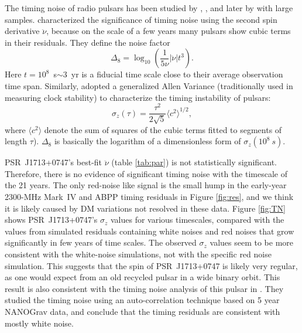 The timing noise of radio pulsars has been studied by \citet{antt94},
\citet{dmhd95}, \citet{mtem97} and later by \citet{hlk10} with large samples. 
\citet{antt94} characterized the significance of timing noise using the second
spin derivative $\ddot{\nu}$, because on the scale of a few years many
pulsars show cubic terms in their residuals. They define the noise factor 
\begin{equation}
\label{eq:delta8}
\Delta_8 = \log_{10}\left(\frac{1}{5\nu}|\ddot{\nu}|t^3\right).
\end{equation}
Here $t=10^8$~s$\sim 3$~yr is a fiducial time scale close to their average
observation time span.
Similarly, \citet{mtem97} adopted a generalized Allen Variance (traditionally used in
measuring clock stability) to characterize the timing instability of pulsars:
\begin{equation}
\label{eq:sigmaz}
\sigma_z(\tau) = \frac{\tau^2}{2\sqrt{5}}\langle c^2 \rangle^{1/2},
\end{equation}
where $\langle c^2\rangle$ denote the sum of squares of the cubic
terms fitted to segments of length $\tau$). 
$\Delta_8$ is basically the logarithm of a dimensionless form of $\sigma_z(10^8~s)$.

PSR~J1713+0747's
best-fit $\ddot{\nu}$ (table \ref{tab:par}) is not statistically significant. 
Therefore, there is no evidence of significant timing noise with the
timescale of the 21 years. The only red-noise like
signal is the small hump in the early-year 2300-MHz Mark~IV and ABPP timing
residuals in Figure \ref{fig:res}, and we think it is likely caused by DM variations not resolved in
these data. Figure \ref{fig:TN} 
shows PSR~J1713+0747's $\sigma_z$ values for various timescales, compared 
with the values from simulated residuals containing white noises and
red noises that grow significantly in few years of time
scales. The observed $\sigma_z$ values seem to be more consistent 
with the white-noise simulations, not with the specific red noise
simulation. This suggests that the spin of PSR~J1713+0747 is likely very
regular, as one would expect from an old recycled pulsar in a wide binary
orbit. %
This result is also consistent with the timing noise analysis of this pulsar in 
\citet{pjl+13}. They
studied the timing noise using an auto-correlation technique
based on 5 year NANOGrav data, and conclude that the timing residuals are
consistent with mostly white noise.


